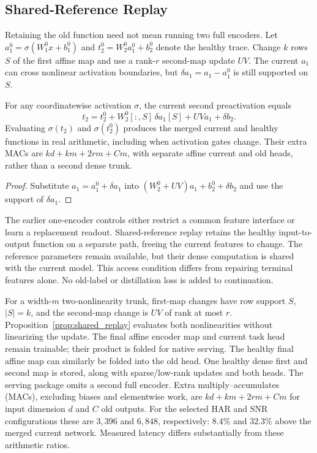 \subsection{Shared-Reference Replay}\label{app:shared_replay}

Retaining the old function need not mean running two full encoders. Let
$a_1^0=\sigma(W_1^0x+b_1^0)$ and $t_2^0=W_2^0a_1^0+b_2^0$ denote the
healthy trace. Change $k$ rows $S$ of the first affine map and use a rank-$r$
second-map update $UV$. The current $a_1$ can cross nonlinear activation
boundaries, but $\delta a_1=a_1-a_1^0$ is still supported on $S$.

\begin{proposition}\label{prop:shared_replay}
For any coordinatewise activation $\sigma$, the current second preactivation
equals
\[
t_2=t_2^0+W_2^0[:,S]\,\delta a_1[S]+UVa_1+\delta b_2.
\]
Evaluating $\sigma(t_2)$ and $\sigma(t_2^0)$ produces the merged current and
healthy functions in real arithmetic, including when activation gates change.
Their extra MACs are $kd+km+2rm+Cm$, with separate affine current and old
heads, rather than a second dense trunk.
\end{proposition}
\begin{proof}
Substitute $a_1=a_1^0+\delta a_1$ into
$(W_2^0+UV)a_1+b_2^0+\delta b_2$ and use the support of $\delta a_1$.
\end{proof}


The earlier one-encoder controls either restrict a common feature interface
or learn a replacement readout. Shared-reference replay retains the healthy input-to-output function
on a separate path, freeing the current features to change. The reference parameters
remain available, but their dense computation is shared with the current
model. This access condition differs from repairing terminal features alone.
No old-label or distillation loss is added to continuation.

For a width-$m$ two-nonlinearity trunk, first-map changes have row support
$S$, $|S|=k$, and the second-map change is $UV$ of rank at most $r$.
Proposition~\ref{prop:shared_replay} evaluates both nonlinearities without
linearizing the update. The final affine encoder map and current task head
remain trainable; their product is folded for native serving. The healthy
final affine map can similarly be folded into the old head. One healthy
dense first and second map is stored, along with sparse/low-rank updates
and both heads. The serving package omits a second full encoder.
Extra multiply--accumulates (MACs), excluding biases and elementwise work,
are $kd+km+2rm+Cm$ for input dimension $d$ and $C$ old outputs.
For the selected HAR and SNR configurations these are $3{,}396$ and
$6{,}848$, respectively: $8.4\%$ and $32.3\%$ above the merged current
network. Measured latency differs substantially from these arithmetic ratios.

